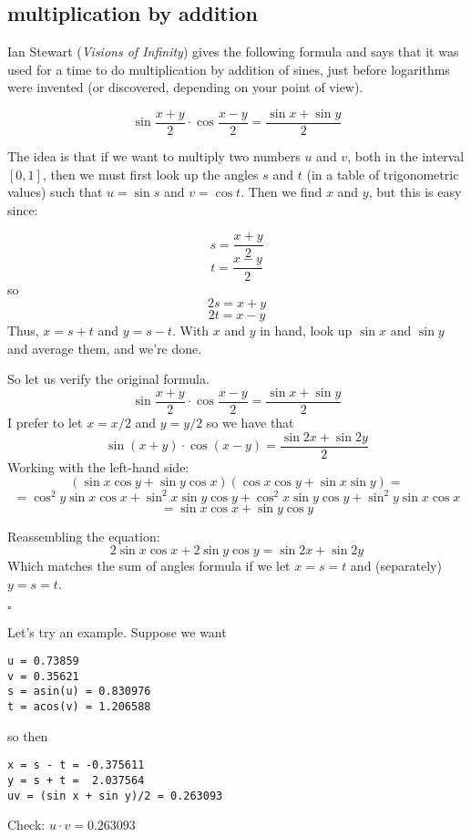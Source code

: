 \documentclass[11pt, oneside]{article}
\begin{document}
\subsection*{multiplication by addition}

Ian Stewart (\emph{Visions of Infinity}) gives the following formula and says that it was used for a time to do multiplication by addition of sines, just before logarithms were invented (or discovered, depending on your point of view).

\[ \sin \frac{x + y}{2} \cdot \cos \frac{x - y}{2} = \frac{\sin x + \sin y}{2} \]

The idea is that if we want to multiply two numbers $u$ and $v$, both in the interval $[0,1]$, then we must first look up the angles $s$ and $t$ (in a table of trigonometric values) such that $u = \sin s$ and $v = \cos t$.  Then we find $x$ and $y$, but this is easy since:

\[ s = \frac{x + y}{2} \]
\[ t = \frac{x - y}{2} \]
so
\[ 2s = x + y \]
\[ 2t = x - y \]
Thus, $x = s + t$ and $y = s - t$.  With $x$ and $y$ in hand, look up $\sin x$ and $\sin y$ and average them, and we're done.

So let us verify the original formula.
\[ \sin \frac{x + y}{2} \cdot \cos \frac{x - y}{2} = \frac{\sin x + \sin y}{2} \]
I prefer to let $x = x/2$ and $y = y/2$ so we have that
\[ \sin (x + y) \cdot \cos(x - y) = \frac{\sin 2x + \sin 2y}{2} \]
Working with the left-hand side:
\[ (\sin x \cos y + \sin y \cos x)(\cos x \cos y + \sin x \sin y) = \]
\[ = \cos^2 y \sin x \cos x + \sin^2 x \sin y \cos y + \cos^2 x \sin y \cos y + \sin^2 y \sin x \cos x \]
\[ = \sin x \cos x + \sin y \cos y \]

Reassembling the equation:
\[ 2 \sin x \cos x + 2 \sin y \cos y = \sin 2x + \sin 2y \]
Which matches the sum of angles formula if we let $x = s = t$ and (separately) $y = s = t$.

$\square$

Let's try an example.  Suppose we want

\begin{verbatim}
u = 0.73859
v = 0.35621
s = asin(u) = 0.830976
t = acos(v) = 1.206588
\end{verbatim}

so then
\begin{verbatim}
x = s - t = -0.375611
y = s + t =  2.037564
uv = (sin x + sin y)/2 = 0.263093
\end{verbatim}

Check:  $u \cdot v = 0.263093$
\end{document}
